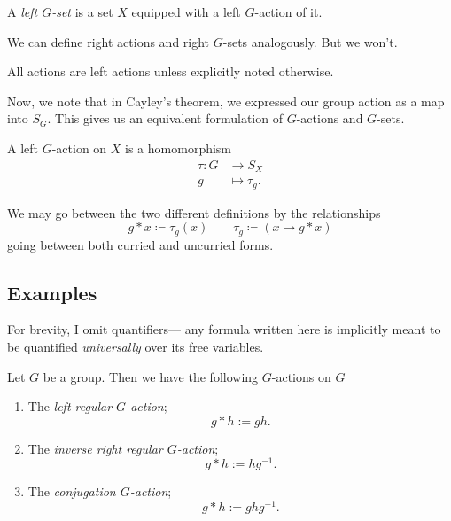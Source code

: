 \documentclass{article}
\begin{document}
\begin{definition}[$G$-sets]
    A \textit{left $G$-set} is a set $X$ equipped with a left $G$-action of it.
\end{definition}

We can define right actions and right $G$-sets analogously.
But we won't.

\begin{convention}
    All actions are left actions unless explicitly noted otherwise.
\end{convention}

Now, we note that in Cayley's theorem, we expressed our group action as a map into $S_G$.
This gives us an equivalent formulation of $G$-actions and $G$-sets.

\begin{definition}
    A left $G$-action on $X$ is a homomorphism
    \begin{align*}
        \tau: G &\to S_X \\
        g &\mapsto \tau_g.
    \end{align*}
\end{definition}

We may go between the two different definitions by the relationships
\[
    g \ast x \coloneq \tau_g(x) \qquad \tau_g \coloneq (x \mapsto g \ast x)
\]
going between both curried and uncurried forms.


\subsection{Examples}

For brevity, I omit quantifiers--- any formula written here is implicitly meant to be quantified \textit{universally} over its free variables.

\begin{example}
    Let $G$ be a group. 
    Then we have the following $G$-actions on $G$
    \begin{enumerate}[label=(\alph*)]
        \item The \textit{left regular $G$-action};
            \[
                g \ast h := gh.
            \]
        \item The \textit{inverse right regular $G$-action};
            \[
                g \ast h := hg^{-1}.
            \]
        \item The \textit{conjugation $G$-action};
            \[
                g \ast h := ghg^{-1}.
            \]
    \end{enumerate}
\end{example}
\end{document}
